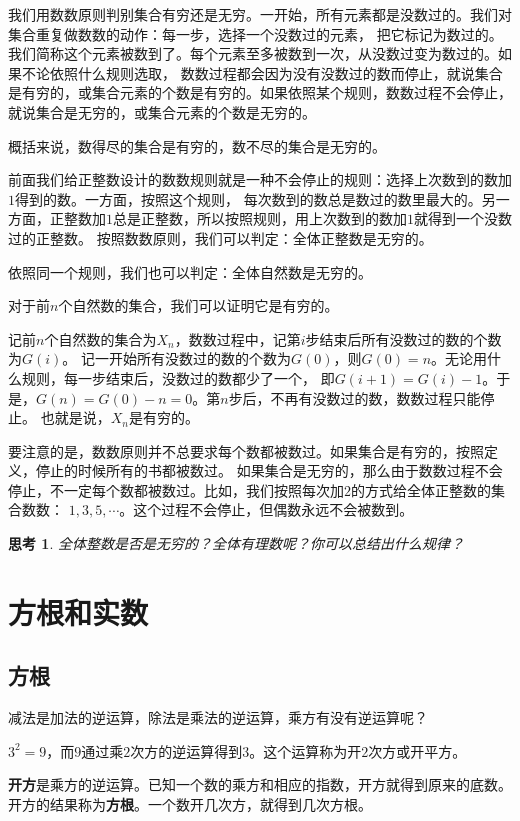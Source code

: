 \documentclass[12pt,UTF8]{ctexbook}
\newtheorem{sk}{思考}[section]
\begin{document}
我们用数数原则判别集合有穷还是无穷。一开始，所有元素都是没数过的。我们对集合重复做数数的动作：每一步，选择一个没数过的元素，
把它标记为数过的。我们简称这个元素被数到了。每个元素至多被数到一次，从没数过变为数过的。如果不论依照什么规则选取，
数数过程都会因为没有没数过的数而停止，就说集合是有穷的，或集合元素的个数是有穷的。如果依照某个规则，数数过程不会停止，
就说集合是无穷的，或集合元素的个数是无穷的。

概括来说，数得尽的集合是有穷的，数不尽的集合是无穷的。

前面我们给正整数设计的数数规则就是一种不会停止的规则：选择上次数到的数加$1$得到的数。一方面，按照这个规则，
每次数到的数总是数过的数里最大的。另一方面，正整数加$1$总是正整数，所以按照规则，用上次数到的数加$1$就得到一个没数过的正整数。
按照数数原则，我们可以判定：全体正整数是无穷的。

依照同一个规则，我们也可以判定：全体自然数是无穷的。

对于前$n$个自然数的集合，我们可以证明它是有穷的。

记前$n$个自然数的集合为$X_n$，数数过程中，记第$i$步结束后所有没数过的数的个数为$G(i)$。
记一开始所有没数过的数的个数为$G(0)$，则$G(0) = n$。无论用什么规则，每一步结束后，没数过的数都少了一个，
即$G(i+1) = G(i) - 1$。于是，$G(n) = G(0) - n = 0$。第$n$步后，不再有没数过的数，数数过程只能停止。
也就是说，$X_n$是有穷的。

要注意的是，数数原则并不总要求每个数都被数过。如果集合是有穷的，按照定义，停止的时候所有的书都被数过。
如果集合是无穷的，那么由于数数过程不会停止，不一定每个数都被数过。比如，我们按照每次加$2$的方式给全体正整数的集合数数：
$1,3,5,\cdots$。这个过程不会停止，但偶数永远不会被数到。

\begin{sk}
    全体整数是否是无穷的？全体有理数呢？你可以总结出什么规律？
\end{sk}

\chapter{方根和实数}

\section{方根}
减法是加法的逆运算，除法是乘法的逆运算，乘方有没有逆运算呢？

$3^2 = 9$，而$9$通过乘$2$次方的逆运算得到$3$。这个运算称为开$2$次方或开平方。

\textbf{开方}是乘方的逆运算。已知一个数的乘方和相应的指数，开方就得到原来的底数。
开方的结果称为\textbf{方根}。一个数开几次方，就得到几次方根。
\end{document}
